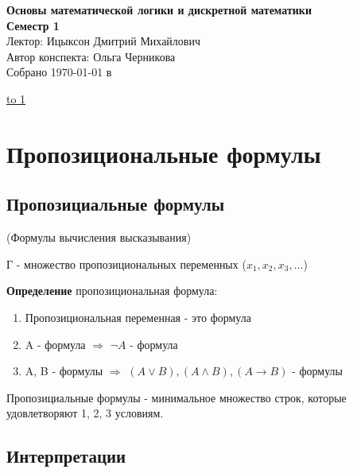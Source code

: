 \documentclass[12pt]{article}
\begin{document}
\begin{center}
  {\Large \bf Основы математической логики и дискретной математики} \\ 
  \vspace{0.5em}
  {\Large \bf Семестр 1} \\
  \vspace{0.5em}
  {\Large Лектор: Ицыксон Дмитрий Михайлович} \\
  \vspace{0.5em}
  {\large Автор конспекта: Ольга Черникова} \\
  \vspace{0.5em}
  {Собрано {\today} в {\currenttime}}
\end{center}

\vspace{-1em}
\noindent \underline{\hbox to 1\textwidth{{ } \hfil{ } \hfil{ } }}

\vspace{1em}
\tableofcontents
\pagebreak

\section{Пропозициональные формулы}

\subsection{Пропозициальные формулы}

(Формулы вычисления высказывания)

Г - множество пропозициональных переменных ($x_1, x_2, x_3, \ldots$)

\begin{description}
\item {\bf Определение} пропозициональная формула:
\begin{enumerate}
\item Пропозициональная переменная - это формула
\item A - формула $\Rightarrow$ $\neg A$ - формула
\item A, B - формулы $\Rightarrow$ $(A \vee B), (A \wedge B), (A \to B)$ - формулы
\end{enumerate}
Пропозициальные формулы - минимальное множество строк, которые удовлетворяют 1, 2, 3 условиям.
\end{description}

\subsection{Интерпретации}
\end{document}
